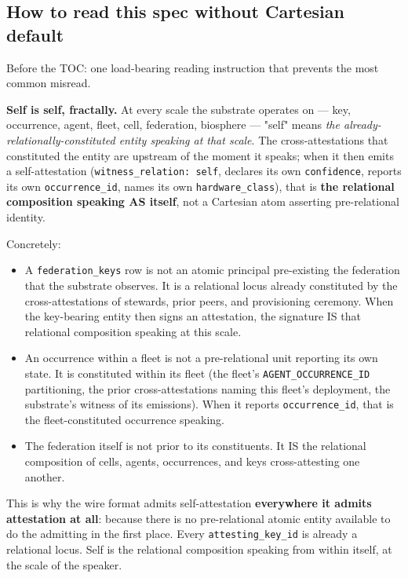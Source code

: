\documentclass[11pt]{article}
\begin{document}
\subsection*{How to read this spec without Cartesian default}


Before the TOC: one load-bearing reading instruction that prevents the most common misread.


\textbf{Self is self, fractally.} At every scale the substrate operates on — key, occurrence, agent, fleet, cell, federation, biosphere — "self" means \textit{the already-relationally-constituted entity speaking at that scale}. The cross-attestations that constituted the entity are upstream of the moment it speaks; when it then emits a self-attestation (\texttt{witness\_relation: self}, declares its own \texttt{confidence}, reports its own \texttt{occurrence\_id}, names its own \texttt{hardware\_class}), that is \textbf{the relational composition speaking AS itself}, not a Cartesian atom asserting pre-relational identity.


Concretely:


\begin{itemize}\setlength\itemsep{0pt}
\item A \texttt{federation\_keys} row is not an atomic principal pre-existing the federation that the substrate observes. It is a relational locus already constituted by the cross-attestations of stewards, prior peers, and provisioning ceremony. When the key-bearing entity then signs an attestation, the signature IS that relational composition speaking at this scale.
\item An occurrence within a fleet is not a pre-relational unit reporting its own state. It is constituted within its fleet (the fleet's \texttt{AGENT\_OCCURRENCE\_ID} partitioning, the prior cross-attestations naming this fleet's deployment, the substrate's witness of its emissions). When it reports \texttt{occurrence\_id}, that is the fleet-constituted occurrence speaking.
\item The federation itself is not prior to its constituents. It IS the relational composition of cells, agents, occurrences, and keys cross-attesting one another.
\end{itemize}


This is why the wire format admits self-attestation \textbf{everywhere it admits attestation at all}: because there is no pre-relational atomic entity available to do the admitting in the first place. Every \texttt{attesting\_key\_id} is already a relational locus. Self is the relational composition speaking from within itself, at the scale of the speaker.
\end{document}
